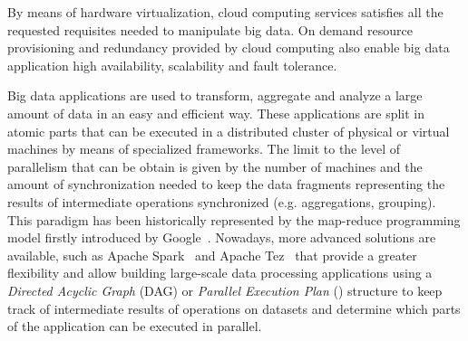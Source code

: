 

By means of hardware virtualization, cloud computing services satisfies all the requested requisites needed to manipulate big data. On demand resource provisioning and redundancy provided by cloud computing also enable big data application high availability, scalability and fault tolerance.

Big data applications are used to transform, aggregate and analyze a large amount of data in an easy and efficient way. These applications are split in atomic parts that can be executed in a distributed cluster of physical or virtual machines by means of specialized frameworks. The limit to the level of parallelism that can be obtain is given by the number of machines and the amount of synchronization needed to keep the data fragments representing the results of intermediate operations synchronized (e.g. aggregations, grouping). This paradigm has been historically represented by the map-reduce programming model firstly introduced by Google~\cite{misc:GoogleMapReduce}. Nowadays, more advanced solutions are available, such as Apache Spark~\cite{misc:ApacheSpark} and Apache Tez~\cite{misc:ApacheTez} that provide a greater flexibility and allow building large-scale data processing applications using a \textit{Directed Acyclic Graph} (DAG) or \textit{Parallel Execution Plan} (\plan) structure to keep track of intermediate results of operations on datasets and determine which parts of the application can be executed in parallel.

